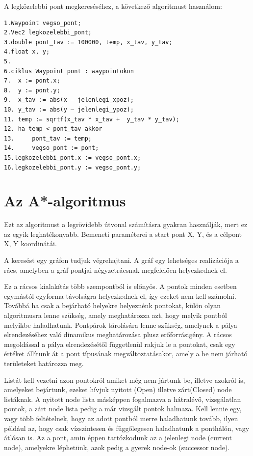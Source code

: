 
A legközelebbi pont megkereséséhez, a következő algoritmust használom:
\begin{verbatim} 
1.Waypoint vegso_pont;
2.Vec2 legkozelebbi_pont;
3.double pont_tav := 100000, temp, x_tav, y_tav;
4.float x, y;
5.
6.ciklus Waypoint pont : waypointokon
7.	x := pont.x;
8.	y := pont.y;
9.	x_tav := abs(x – jelenlegi_xpoz);
10.	y_tav := abs(y – jelenlegi_ypoz);
11.	temp := sqrtf(x_tav * x_tav +  y_tav * y_tav);
12.	ha temp < pont_tav akkor
13.		pont_tav := temp;
14.		vegso_pont := pont;
15.legkozelebbi_pont.x := vegso_pont.x;
16.legkozelebbi_pont.y := vegso_pont.y; 
\end{verbatim}

\section{Az A*-algoritmus}


Ezt az algoritmust a legrövidebb útvonal számításra gyakran használják, mert ez az egyik leghatékonyabb. Bemeneti paraméterei a start pont X, Y, és a célpont X, Y koordinátái. 

A keresést egy gráfon tudjuk végrehajtani. A gráf egy lehetséges realizációja a rács, amelyben a gráf pontjai négyzetrácsnak megfelelően helyezkednek el.

Ez a rácsos kialakítás több szempontból is előnyös. A pontok minden esetben egymástól egyforma távolságra helyezkednek el, így ezeket nem kell számolni. Továbbá ha csak a bejárható helyekre helyeznénk pontokat, külön olyan algoritmusra lenne szükség, amely meghatározza azt, hogy melyik pontból melyikbe haladhatunk. Pontpárok tárolására lenne szükség, amelynek a pálya elrendezéséhez való dinamikus meghatározása plusz erőforrásigény. A rácsos megoldással a pálya elrendezésétől függetlenül rakjuk le a pontokat, csak egy értéket állítunk át a pont típusának megváltoztatásakor, amely a be nem járható területeket határozza meg.

Listát kell vezetni azon pontokról amiket még nem jártunk be, illetve azokról is, amelyeket bejártunk, ezeket hívjuk nyitott (Open) illetve zárt(Closed) node listáknak. A nyitott node lista másképpen fogalmazva a hátralévő, vizsgálatlan pontok, a zárt node lista pedig a már vizsgált pontok halmaza. Kell lennie egy, vagy több feltételnek, hogy az adott pontból merre haladhatunk tovább, ilyen például az, hogy csak vízszintesen és függőlegesen haladhatunk a ponthálón, vagy átlósan is.  Az a pont, amin éppen tartózkodunk az a jelenlegi node (current node), amelyekre léphetünk, azok pedig a gyerek node-ok (successor node).

